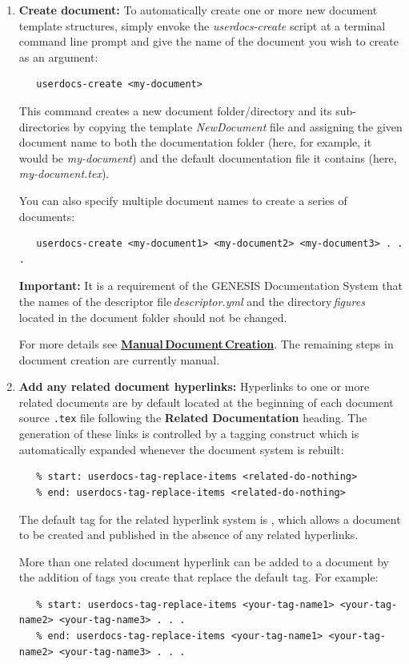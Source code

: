 \documentclass[12pt]{article}
\begin{document}
\begin{enumerate}

\item[]{\bf Create document:}  To automatically create one or more new document template structures, simply envoke the {\it userdocs-create} script at a terminal command line prompt and give the name of the document you wish to create as an argument:
\begin{verbatim}
   userdocs-create <my-document>
\end{verbatim}
This command creates a new document folder/directory and its sub-directories by copying the template {\it NewDocument} file and assigning the given document name to both the documentation folder (here, for example, it would be {\it my-document}) and the default documentation file it contains (here, {\it my-document.tex}).

You can also specify multiple document names to create a series of documents:
\begin{verbatim}
   userdocs-create <my-document1> <my-document2> <my-document3> . . .
\end{verbatim}
{\bf Important:} It is a requirement of the GENESIS Documentation System that the names of the descriptor file\,{\it descriptor.yml} and the directory\,{\it figures} located in the document folder should not be changed.

For more details see \href{../document-create-manual/document-create-manual.tex}{\bf Manual\,Document\,Creation}. The remaining steps in document creation are currently manual.

\item[]{\bf Add any related document hyperlinks:} Hyperlinks to one or more related documents are by default located at the beginning of each document source {\tt .tex} file following the {\bf Related Documentation} heading. The generation of these links is controlled by a tagging construct which is automatically expanded whenever the document system is rebuilt:
\begin{verbatim}
   % start: userdocs-tag-replace-items <related-do-nothing>
   % end: userdocs-tag-replace-items <related-do-nothing>
\end{verbatim}
The default tag for the related hyperlink system is {\tt <related-do-nothing>}, which allows a document to be created and published in the absence of any related hyperlinks. 

More than one related document hyperlink can be added to a document by the addition of tags you create that replace the default tag. For example:
\begin{verbatim}
   % start: userdocs-tag-replace-items <your-tag-name1> <your-tag-name2> <your-tag-name3> . . .
   % end: userdocs-tag-replace-items <your-tag-name1> <your-tag-name2> <your-tag-name3> . . .
\end{verbatim}


\end{enumerate}
\end{document}
